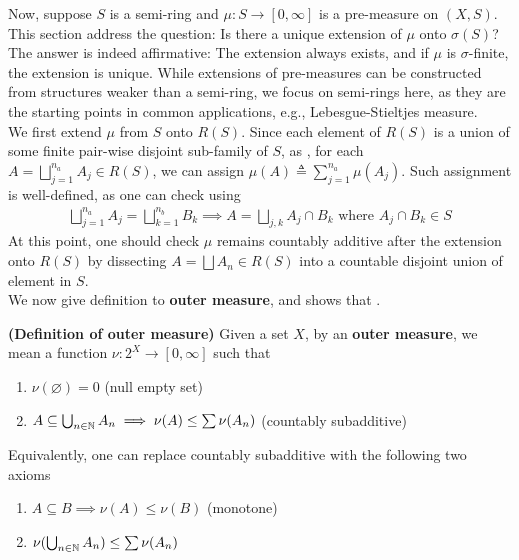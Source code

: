 \documentclass{report}
\begin{document}
\begin{mdframed}
Now, suppose $S$ is a semi-ring and $\mu:S\rightarrow [0,\infty]$ is a pre-measure on $(X,S)$. This section address the question: Is there a unique extension of $\mu$ onto $\sigma (S)$? The answer is indeed affirmative: The extension always exists, and if $\mu$ is $\sigma$-finite, the extension is unique. 
While extensions of pre-measures can be constructed from structures weaker than a semi-ring, we focus on semi-rings here, as they are the starting points in common applications, e.g., Lebesgue-Stieltjes measure.\\

We first extend $\mu$ from $S$ onto $R(S)$. Since each element of $R(S)$ is a union of some finite pair-wise disjoint sub-family of $S$, as , for each $A=\bigsqcup_{j=1}^{n_a}A_j \in R(S)$, we can assign $\mu(A)\triangleq \sum_{j=1}^{n_a}\mu (A_j)$. Such assignment is well-defined, as one can check using  
\begin{align*}
\bigsqcup_{j=1}^{n_a}A_j = \bigsqcup _{k=1}^{n_b}B_k \implies A=\bigsqcup_{j,k} A_j \cap B_k \text{ where }A_j\cap B_k \in S 
\end{align*}
At this point, one should check $\mu$ remains countably additive after the extension onto $R(S)$ by dissecting $A=\bigsqcup A_n \in R(S)$ into a countable disjoint union of element in $S$. \\



We now give definition to \textbf{outer measure}, and shows that .
\end{mdframed}
\begin{definition}
\textbf{(Definition of outer measure)} Given a set $X$, by an  \textbf{outer measure}, we mean a function $\nu :2^X\rightarrow [0,\infty]$ such that 
\begin{enumerate}[label=(\alph*)]
  \item $ \nu  (\varnothing)=0$ (null empty set)
  \item $A\subseteq \bigcup_{n\in\mathbb{N}} A_n\implies \nu  (A)\leq  \sum \nu (A_n)$ (countably subadditive)
\end{enumerate}
\end{definition}
\begin{mdframed}
Equivalently, one can replace countably subadditive with the following two axioms   
\begin{enumerate}[label=(\alph*)]
  \item $A \subseteq B \implies \nu (A) \leq \nu  (B)$  (monotone)
  \item $\nu  (\bigcup_{n\in\mathbb{N}} A_n )\leq \sum \nu (A_n)$  
\end{enumerate}

\end{mdframed}
\end{document}
